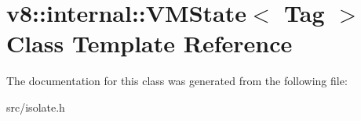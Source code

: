 \hypertarget{classv8_1_1internal_1_1_v_m_state}{}\section{v8\+:\+:internal\+:\+:V\+M\+State$<$ Tag $>$ Class Template Reference}
\label{classv8_1_1internal_1_1_v_m_state}


The documentation for this class was generated from the following file\+:\begin{DoxyCompactItemize}
\item 
src/isolate.\+h\end{DoxyCompactItemize}
